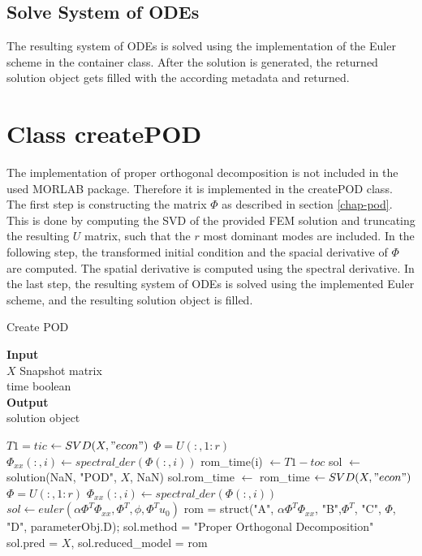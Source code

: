 \subsection{Solve System of ODEs}
The resulting system of ODEs is solved using the implementation of the Euler scheme in the container class.
After the solution is generated, the returned solution object gets filled with the according metadata and returned.

\section{Class createPOD}
The implementation of proper orthogonal decomposition is not included in the used MORLAB package.
Therefore it is implemented in the createPOD class.
The first step is constructing the matrix \(\Phi\) as described in section \ref{chap-pod}.
This is done by computing the SVD of the provided FEM solution and truncating the resulting \(U\) matrix, such that the \(r\) most dominant modes are included.
In the following step, the transformed initial condition and the spacial derivative of \(\Phi\) are computed.
The spatial derivative is computed using the spectral derivative.
In the last step, the resulting system of ODEs is solved using the implemented Euler scheme, and the resulting solution object is filled.
\begin{algorithm}[H]
\caption{Create POD}
\textbf{Input} \\
\hspace*{\algorithmicindent} $X$ Snapshot matrix \\
\hspace*{\algorithmicindent} time boolean \\
\textbf{Output} \\
\hspace*{\algorithmicindent} solution object
\begin{algorithmic}[1]
\State $T1 = tic$
\State [$U$, $S$, $V$] $\gets SVD(X, "econ")$
\State $\Phi = U(:, 1:r)$
\State $\Phi_{xx}(:, i) \gets spectral\_der(\Phi(:, i))$
\State rom\_time(i) $\gets T1 - toc$
\EndFor
\EndFor
\State sol $\gets$ solution(NaN, "POD", $X$, NaN)
\State sol.rom\_time $\gets$ rom\_time
\EndIf
\State [$U$, $S$, $V$] $\gets SVD(X, "econ")$
\State $\Phi = U(:, 1:r)$
\State $\Phi_{xx}(:, i) \gets spectral\_der(\Phi(:, i))$
\EndFor
\State $sol \gets euler(\alpha \Phi^{T} \Phi_{xx}, \Phi^{T}, \phi, \Phi^{T} u_0)$
\State rom = struct("A", $\alpha \Phi^{T} \Phi_{xx}$, "B",$\Phi^{T}$, "C", $\Phi$, "D", parameterObj.D);
\State sol.method = "Proper Orthogonal Decomposition"
\State sol.pred = $X$, sol.reduced\_model = rom
\EndProcedure
\end{algorithmic}
\end{algorithm}

